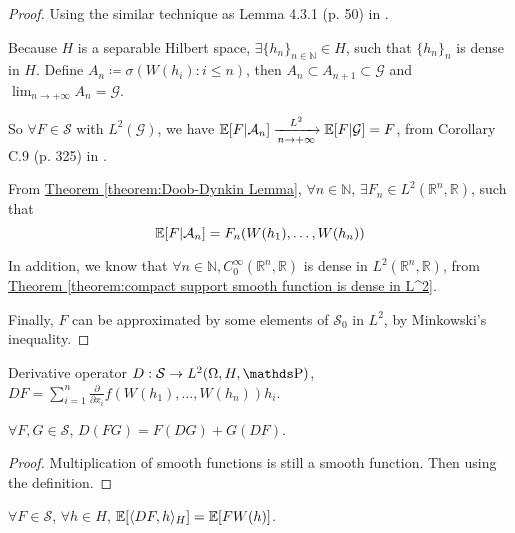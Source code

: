 \begin{proof}
Using the similar technique as Lemma 4.3.1 (p. 50) in 
\parencite{S}. 

Because $H$ is a separable Hilbert space, 
$\exists \{h_n\}_{n \in \mathbb{N}} \in H$, such that $\{h_n\}_{n}$ is dense in  $H$. Define $A_n \coloneqq \sigma(W(h_i): i \leq n)$, then $A_n \subset A_{n+1} \subset \mathcal{G}$ and $\lim_{n \to +\infty} A_n = \mathcal{G}$. 

So $\forall F \in \mathcal{S}$ with $L^2(\mathcal{G})$, 
we have $\operatorname{\mathbb{E}}[F | \mathcal{A}_n] 
\xrightarrow[n \to +\infty]{L^2} 
\operatorname{\mathbb{E}}[F | \mathcal{G}] = F $, 
from Corollary C.9 (p. 325) in 
\parencite{S}. 

From \hyperref[theorem:Doob-Dynkin Lemma]
{Theorem \ref*{theorem:Doob-Dynkin Lemma}}, 
$\forall n \in \mathbb{N}$, $\exists F_n \in L^2(\mathbb{R}^n, \mathbb{R})$, 
such that 
\[\operatorname{\mathbb{E}}[F | \mathcal{A}_n] = F_n(W(h_1), \dots, W(h_n))\]

In addition, we know that $\forall n \in \mathbb{N}, C_{0}^{\infty}(\mathbb{R}^n, \mathbb{R})$ is dense in $L^2(\mathbb{R}^n, \mathbb{R})$, 
from \hyperref[theorem:compact support smooth function is dense in L^2]
{Theorem \ref*{theorem:compact support smooth function is dense in L^2}}. 

Finally, $F$ can be approximated by some elements of $\mathcal{S}_{0}$ in $L^2$, by Minkowski's inequality.  
\end{proof}

\begin{definition}[derivative]
Derivative operator $D : \mathcal{S} \to L^2(\Omega, H, \Prob)$, 
$DF = \sum_{i=1}^{n} \frac{\partial }{\partial x_i} f(W(h_1), \dots, W(h_n)) h_i$. 
\end{definition}

\begin{lemma}
\label{lemma:rule}
$\forall F, G \in \mathcal{S}$, 
$D(FG) = F(DG) + G(DF)$. 
\end{lemma}

\begin{proof}
Multiplication of smooth functions is still a smooth function. Then using the definition. 
\end{proof}

\begin{proposition}
\label{proposition:one variable}
$\forall F \in \mathcal{S}$, $\forall h \in H$, 
$\operatorname{\mathbb{E}}[\langle DF, h \rangle_{H}] 
= \operatorname{\mathbb{E}}[FW(h)]$. 
\end{proposition}

